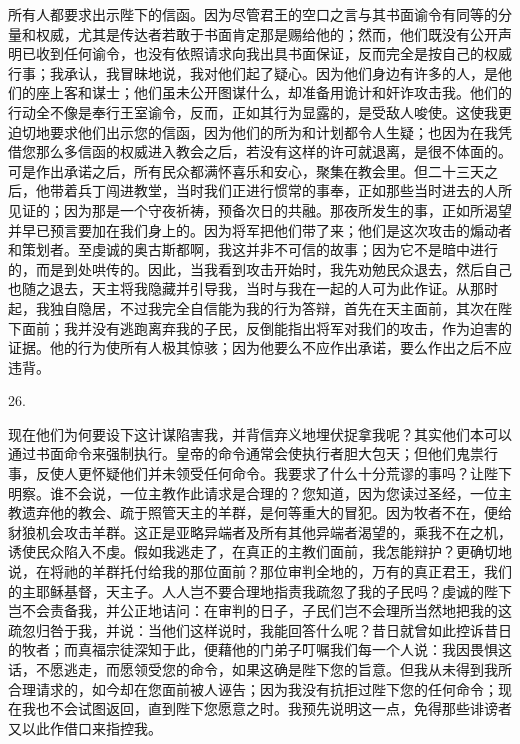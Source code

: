 所有人都要求出示陛下的信函。因为尽管君王的空口之言与其书面谕令有同等的分量和权威，尤其是传达者若敢于书面肯定那是赐给他的；然而，他们既没有公开声明已收到任何谕令，也没有依照请求向我出具书面保证，反而完全是按自己的权威行事；我承认，我冒昧地说，我对他们起了疑心。因为他们身边有许多的人，是他们的座上客和谋士；他们虽未公开图谋什么，却准备用诡计和奸诈攻击我。他们的行动全不像是奉行王室谕令，反而，正如其行为显露的，是受敌人唆使。这使我更迫切地要求他们出示您的信函，因为他们的所为和计划都令人生疑；也因为在我凭借您那么多信函的权威进入教会之后，若没有这样的许可就退离，是很不体面的。可是作出承诺之后，所有民众都满怀喜乐和安心，聚集在教会里。但二十三天之后，他带着兵丁闯进教堂，当时我们正进行惯常的事奉，正如那些当时进去的人所见证的；因为那是一个守夜祈祷，预备次日的共融。那夜所发生的事，正如所渴望并早已预言要加在我们身上的。因为将军把他们带了来；他们是这次攻击的煽动者和策划者。至虔诚的奥古斯都啊，我这并非不可信的故事；因为它不是暗中进行的，而是到处哄传的。因此，当我看到攻击开始时，我先劝勉民众退去，然后自己也随之退去，天主将我隐藏并引导我，当时与我在一起的人可为此作证。从那时起，我独自隐居，不过我完全自信能为我的行为答辩，首先在天主面前，其次在陛下面前；我并没有逃跑离弃我的子民，反倒能指出将军对我们的攻击，作为迫害的证据。他的行为使所有人极其惊骇；因为他要么不应作出承诺，要么作出之后不应违背。\par

26. \par

现在他们为何要设下这计谋陷害我，并背信弃义地埋伏捉拿我呢？其实他们本可以通过书面命令来强制执行。皇帝的命令通常会使执行者胆大包天；但他们鬼祟行事，反使人更怀疑他们并未领受任何命令。我要求了什么十分荒谬的事吗？让陛下明察。谁不会说，一位主教作此请求是合理的？您知道，因为您读过圣经，一位主教遗弃他的教会、疏于照管天主的羊群，是何等重大的冒犯。因为牧者不在，便给豺狼机会攻击羊群。这正是亚略异端者及所有其他异端者渴望的，乘我不在之机，诱使民众陷入不虔。假如我逃走了，在真正的主教们面前，我怎能辩护？更确切地说，在将祂的羊群托付给我的那位面前？那位审判全地的，万有的真正君王，我们的主耶稣基督，天主子。人人岂不要合理地指责我疏忽了我的子民吗？虔诚的陛下岂不会责备我，并公正地诘问：在审判的日子，子民们岂不会理所当然地把我的这疏忽归咎于我，并说：当他们这样说时，我能回答什么呢？昔日就曾如此控诉昔日的牧者；而真福宗徒深知于此，便藉他的门弟子叮嘱我们每一个人说：我因畏惧这话，不愿逃走，而愿领受您的命令，如果这确是陛下您的旨意。但我从未得到我所合理请求的，如今却在您面前被人诬告；因为我没有抗拒过陛下您的任何命令；现在我也不会试图返回，直到陛下您愿意之时。我预先说明这一点，免得那些诽谤者又以此作借口来指控我。\par

